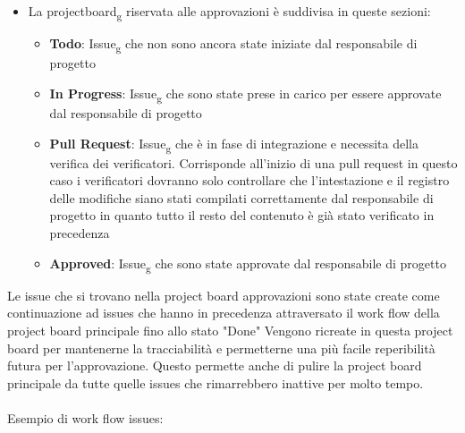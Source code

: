 \begin{itemize}
	\item La projectboard\textsubscript{g} riservata alle approvazioni è suddivisa in queste sezioni:
	\begin{itemize}
		\item \textbf{Todo}: Issue\textsubscript{g} che non sono ancora state iniziate dal responsabile di progetto
		\item \textbf{In Progress}: Issue\textsubscript{g}  che sono state prese in carico per essere approvate dal responsabile di progetto
		\item \textbf{Pull Request}: Issue\textsubscript{g} che è in fase di integrazione e necessita della verifica dei verificatori. Corrisponde all'inizio di una pull request
		in questo caso i verificatori dovranno solo controllare che l'intestazione e il registro delle modifiche siano stati compilati correttamente dal responsabile di progetto in quanto tutto il resto del contenuto è già stato verificato in precedenza
		\item \textbf{Approved}: Issue\textsubscript{g} che sono state approvate dal responsabile di progetto
	\end{itemize}
\end{itemize}
Le issue che si trovano nella project board approvazioni sono state create come continuazione ad issues che hanno in precedenza attraversato il work flow della project board principale fino allo stato "Done"
Vengono ricreate in questa project board per  mantenerne la tracciabilità e permetterne una più facile reperibilità futura per l'approvazione.
Questo permette anche di pulire la project board principale da tutte quelle issues che rimarrebbero inattive per molto tempo.
\\\\
Esempio di work flow issues:
